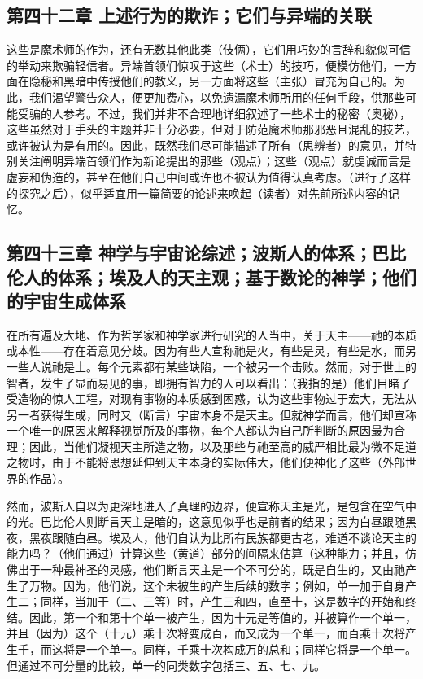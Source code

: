 
\subsection{第四十二章 上述行为的欺诈；它们与异端的关联}

这些是魔术师的作为，还有无数其他此类（伎俩），它们用巧妙的言辞和貌似可信的举动来欺骗轻信者。异端首领们惊叹于这些（术士）的技巧，便模仿他们，一方面在隐秘和黑暗中传授他们的教义，另一方面将这些（主张）冒充为自己的。为此，我们渴望警告众人，便更加费心，以免遗漏魔术师所用的任何手段，供那些可能受骗的人参考。不过，我们并非不合理地详细叙述了一些术士的秘密（奥秘），这些虽然对于手头的主题并非十分必要，但对于防范魔术师那邪恶且混乱的技艺，或许被认为是有用的。因此，既然我们尽可能描述了所有（思辨者）的意见，并特别关注阐明异端首领们作为新论提出的那些（观点）；这些（观点）就虔诚而言是虚妄和伪造的，甚至在他们自己中间或许也不被认为值得认真考虑。（进行了这样的探究之后），似乎适宜用一篇简要的论述来唤起（读者）对先前所述内容的记忆。\par


\subsection{第四十三章 神学与宇宙论综述；波斯人的体系；巴比伦人的体系；埃及人的天主观；基于数论的神学；他们的宇宙生成体系}

在所有遍及大地、作为哲学家和神学家进行研究的人当中，关于天主——祂的本质或本性——存在着意见分歧。因为有些人宣称祂是火，有些是灵，有些是水，而另一些人说祂是土。每个元素都有某些缺陷，一个被另一个击败。然而，对于世上的智者，发生了显而易见的事，即拥有智力的人可以看出：（我指的是）他们目睹了受造物的惊人工程，对现有事物的本质感到困惑，认为这些事物过于宏大，无法从另一者获得生成，同时又（断言）宇宙本身不是天主。但就神学而言，他们却宣称一个唯一的原因来解释视觉所及的事物，每个人都认为自己所判断的原因最为合理；因此，当他们凝视天主所造之物，以及那些与祂至高的威严相比最为微不足道之物时，由于不能将思想延伸到天主本身的实际伟大，他们便神化了这些（外部世界的作品）。\par

然而，波斯人自以为更深地进入了真理的边界，便宣称天主是光，是包含在空气中的光。巴比伦人则断言天主是暗的，这意见似乎也是前者的结果；因为白昼跟随黑夜，黑夜跟随白昼。埃及人，他们自认为比所有民族都更古老，难道不谈论天主的能力吗？（他们通过）计算这些（黄道）部分的间隔来估算（这种能力；并且，仿佛出于一种最神圣的灵感，他们断言天主是一个不可分的，既是自生的，又由祂产生了万物。因为，他们说，这个未被生的产生后续的数字；例如，单一加于自身产生二；同样，当加于（二、三等）时，产生三和四，直至十，这是数字的开始和终结。因此，第一个和第十个单一被产生，因为十元是等值的，并被算作一个单一，并且（因为）这个（十元）乘十次将变成百，而又成为一个单一，而百乘十次将产生千，而这将是一个单一。同样，千乘十次构成万的总和；同样它将是一个单一。但通过不可分量的比较，单一的同类数字包括三、五、七、九。\par

